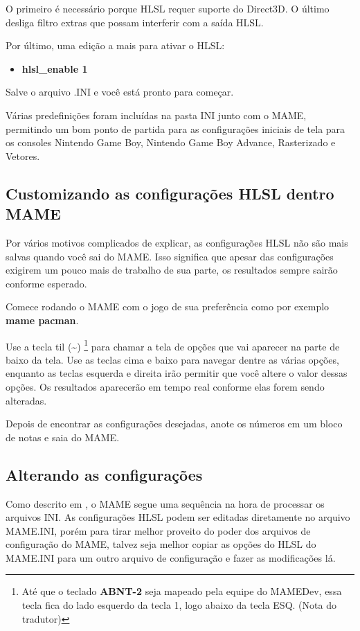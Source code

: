 \documentclass[letterpaper,10pt,brazil]{sphinxmanual}
\begin{document}
O primeiro é necessário porque HLSL requer suporte do Direct3D. O último
desliga filtro extras que possam interferir com a saída HLSL.

Por último, uma edição a mais para ativar o HLSL:
\begin{itemize}
\item {} 
\textbf{hlsl\_enable 1}

\end{itemize}

Salve o arquivo .INI e você está pronto para começar.

Várias predefinições foram incluídas na pasta INI junto com o MAME,
permitindo um bom ponto de partida para as configurações iniciais de
tela para os consoles Nintendo Game Boy, Nintendo Game Boy Advance,
Rasterizado e Vetores.


\subsection{Customizando as configurações HLSL dentro MAME}
\label{advanced/hlsl:customizando-as-configuracoes-hlsl-dentro-mame}
Por vários motivos complicados de explicar, as configurações HLSL não
são mais salvas quando você sai do MAME. Isso significa que apesar das
configurações exigirem um pouco mais de trabalho de sua parte, os
resultados sempre sairão conforme esperado.

Comece rodando o MAME com o jogo de sua preferência como por exemplo
\textbf{mame pacman}.

Use a tecla til (\textbf{\textasciitilde{}}) \footnote[1]{\sphinxAtStartFootnote%
Até que o teclado \textbf{ABNT-2} seja mapeado pela equipe do MAMEDev,
essa tecla fica do lado esquerdo da tecla 1, logo abaixo da
tecla ESQ. (Nota do tradutor)
} para chamar a tela de opções que vai
aparecer na parte de baixo da tela. Use as teclas cima e baixo para
navegar dentre as várias opções, enquanto as teclas esquerda e direita
irão permitir que você altere o valor dessas opções. Os resultados
aparecerão em tempo real conforme elas forem sendo alteradas.

Depois de encontrar as configurações desejadas, anote os números em um
bloco de notas e saia do MAME.


\subsection{Alterando as configurações}
\label{advanced/hlsl:alterando-as-configuracoes}
Como descrito em {\hyperref[advanced/multiconfig:advanced\string-multi\string-cfg]{}}, o MAME segue uma sequência
na hora de processar os arquivos INI. As configurações HLSL podem ser
editadas diretamente no arquivo MAME.INI, porém para tirar melhor
proveito do poder dos arquivos de configuração do MAME, talvez seja
melhor copiar as opções do HLSL do MAME.INI para um outro arquivo de
configuração e fazer as modificações lá.
\end{document}
